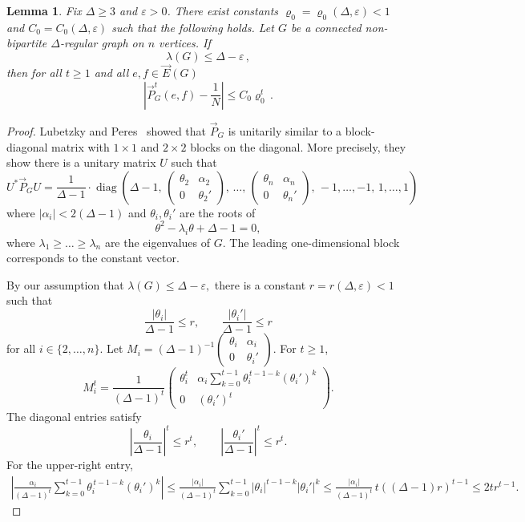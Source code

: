 \documentclass[11pt,a4paper]{article}
\theoremstyle{plain}
\newtheorem{lemma}[theorem]{Lemma}
\let\rho=\varrho
\let\epsilon=\varepsilon
\begin{document}
\begin{lemma}\label{lem-LP-mix}
Fix \(\Delta\ge 3\) and \(\varepsilon>0\). There exist constants
\(\rho_0=\rho_0(\Delta,\epsilon)<1\) and \(C_0=C_0(\Delta,\varepsilon)\) such that the following holds. Let \(G\) be a connected non-bipartite \(\Delta\)-regular graph on \(n\) vertices. If
\[
\lambda(G)\le \Delta-\varepsilon\, ,
\] 
then for all $t\geq 1$ and all $e,f\in \vec E(G)$
\[
\left|\vec P_G^t(e,f)-\frac1N\right|
\le
C_0\rho_0^t\,.
\]
\end{lemma}

\begin{proof}
Lubetzky and Peres~\cite[Proposition 3.1]{LubetzkyPeres} showed that $\vec P_G$ is unitarily similar to a block-diagonal matrix with $1\times1$ and $2\times2$ blocks on the diagonal.
More precisely, they show there is a unitary matrix \(U\)
such that 
\[
U^\ast \vec P_G U
=\frac{1}{\Delta-1}\cdot 
\operatorname{diag}\left(
\Delta-1,\,
\begin{pmatrix}
\theta_2 & \alpha_2\\
0 & \theta_2'
\end{pmatrix},
\,\ldots,\,
\begin{pmatrix}
\theta_n & \alpha_n\\
0 & \theta_n'
\end{pmatrix},
\,-1,\ldots,-1,\,
1,\ldots,1
\right)
\]
where \(|\alpha_i|<2(\Delta-1)\) and
\(\theta_i,\theta_i'\) are the roots of
\[
\theta^2-\lambda_i\theta+\Delta-1=0,
\]
where $\lambda_1\geq\ldots\geq\lambda_n$
are the eigenvalues of $G$. The leading one-dimensional block corresponds to the constant
vector.

By our assumption that
\(
\lambda(G)\le \Delta-\varepsilon,
\)
there is a constant
\(r=r(\Delta,\varepsilon)<1\) such that
\[
\frac{|\theta_i|}{\Delta-1}\le r,
\qquad
\frac{|\theta_i'|}{\Delta-1}\le r
\]
for all $i\in \{2,\ldots,n\}$. 
Let 
\(
M_i=(\Delta-1)^{-1}\begin{pmatrix}
\theta_i & \alpha_i\\
0 & \theta_i'
\end{pmatrix}
\). For \(t\ge1\),
\[
M_i^t
=
\frac1{(\Delta-1)^t}
\begin{pmatrix}
\theta_i^t &
\alpha_i\sum_{k=0}^{t-1}
\theta_i^{\,t-1-k}(\theta_i')^k\\
0 & (\theta_i')^t
\end{pmatrix}.
\]
The diagonal entries satisfy
\[
\left|\frac{\theta_i}{\Delta-1}\right|^t\le r^t,
\qquad
\left|\frac{\theta_i'}{\Delta-1}\right|^t\le r^t.
\]
For the upper-right entry,
\begin{align*}
\left|
\frac{\alpha_i}{(\Delta-1)^t}
\sum_{k=0}^{t-1}
\theta_i^{\,t-1-k}(\theta_i')^k
\right|
\le
\frac{|\alpha_i|}{(\Delta-1)^t}
\sum_{k=0}^{t-1}
|\theta_i|^{t-1-k}|\theta_i'|^k
\le
\frac{|\alpha_i|}{(\Delta-1)^t}\,t((\Delta-1)r)^{t-1}
\le
2t r^{t-1}.
\end{align*}


\end{proof}
\end{document}
